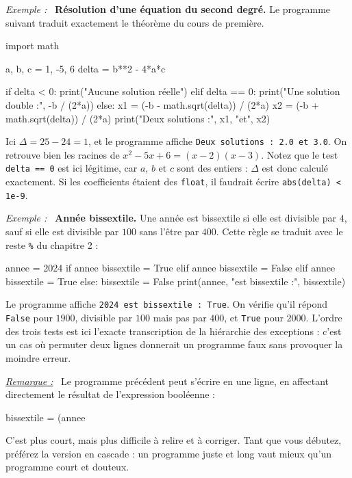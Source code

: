\documentclass[a4paper,11pt,openany]{book}
\newcommand{\code}[1]{\texttt{\textcolor{codebleu}{#1}}}
\newenvironment{exemple}%
 {\par\vspace{1mm}\begin{list}{}{\leftmargin=1cm \rightmargin=0.5cm}\item[]%
  \textit{Exemple :}~}%
 {\end{list}\vspace{1mm}}
\newenvironment{remarque}%
 {\par\vspace{1mm}\begin{list}{}{\leftmargin=1cm \rightmargin=0.5cm}\item[]%
  \textit{\underline{Remarque :}}~}%
 {\end{list}\vspace{1mm}}
\begin{document}
\begin{exemple}
\textbf{Résolution d'une équation du second degré.} Le programme suivant traduit exactement le théorème du cours de première.
\begin{python}
import math

a, b, c = 1, -5, 6
delta = b**2 - 4*a*c

if delta < 0:
    print("Aucune solution réelle")
elif delta == 0:
    print("Une solution double :", -b / (2*a))
else:
    x1 = (-b - math.sqrt(delta)) / (2*a)
    x2 = (-b + math.sqrt(delta)) / (2*a)
    print("Deux solutions :", x1, "et", x2)
\end{python}
Ici $\Delta = 25 - 24 = 1$, et le programme affiche \code{Deux solutions : 2.0 et 3.0}. On retrouve bien les racines de $x^2-5x+6=(x-2)(x-3)$. Notez que le test \code{delta == 0} est ici légitime, car $a$, $b$ et $c$ sont des entiers : $\Delta$ est donc calculé exactement. Si les coefficients étaient des \code{float}, il faudrait écrire \code{abs(delta) < 1e-9}.
\end{exemple}

\begin{exemple}
\textbf{Année bissextile.} Une année est bissextile si elle est divisible par $4$, sauf si elle est divisible par $100$ sans l'être par $400$. Cette règle se traduit avec le reste \code{\%} du chapitre 2 :
\begin{python}
annee = 2024
if annee %
    bissextile = True
elif annee %
    bissextile = False
elif annee %
    bissextile = True
else:
    bissextile = False
print(annee, "est bissextile :", bissextile)
\end{python}
Le programme affiche \code{2024 est bissextile : True}. On vérifie qu'il répond \code{False} pour $1900$, divisible par $100$ mais pas par $400$, et \code{True} pour $2000$. L'ordre des trois tests est ici l'exacte transcription de la hiérarchie des exceptions : c'est un cas où permuter deux lignes donnerait un programme faux sans provoquer la moindre erreur.
\end{exemple}

\begin{remarque}
Le programme précédent peut s'écrire en une ligne, en affectant directement le résultat de l'expression booléenne :
\begin{python}
bissextile = (annee %
\end{python}
C'est plus court, mais plus difficile à relire et à corriger. Tant que vous débutez, préférez la version en cascade : un programme juste et long vaut mieux qu'un programme court et douteux.
\end{remarque}
\end{document}
